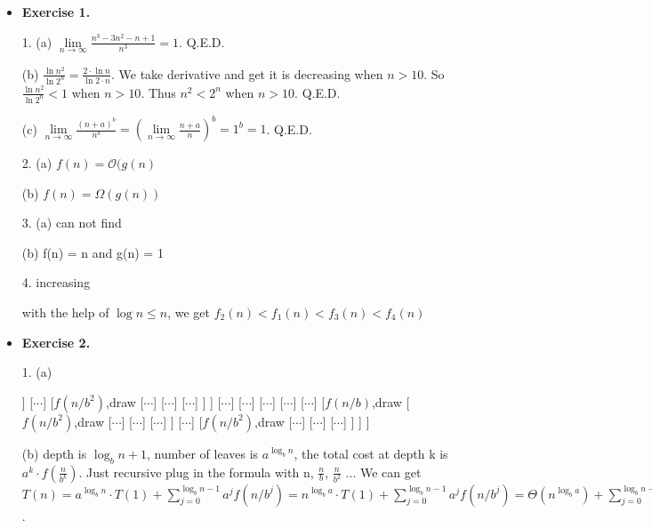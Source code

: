 \documentclass{article}
\begin{document}
\noindent

\noindent{}

\begin{itemize}

\item \textbf{Exercise 1.}

1. (a) $\lim \limits_{n\to \infty}\frac{n^{3}-3 n^{2}-n+1}{n^3} = 1$. Q.E.D.

(b) $\frac{\ln{n^2}}{\ln{2^n}} = \frac{2\cdot \ln{n}}{\ln{2}\cdot n}$. We take derivative and get it is decreasing when $n > 10$. So $\frac{\ln{n^2}}{\ln{2^n}} < 1$ when $n > 10$. Thus $n^2 < 2^n$ when $n > 10$. Q.E.D.

(c) $\lim \limits_{n\to \infty} \frac{(n+a)^b}{n^b} = (\lim \limits_{n\to \infty}\frac{n+a}{n})^b = 1^b = 1$. Q.E.D.

2. (a) $f(n)=\mathcal{O}(g(n)$

(b) $f(n) = \Omega(g(n))$

3. (a) can not find

(b) f(n) = n and g(n) = 1

4. increasing

with the help of $\log{n} \le n$, we get $f_{2}(n)<f_{1}(n)<f_{3}(n)<f_{4}(n)$

\item \textbf{Exercise 2.}

1. (a)

\begin{center}
\begin{forest}
[$f(n)$,draw
	[$f(n/b)$,draw
		[$f(n/b^2)$,draw
			[$\cdots$]
			[$\cdots$]
			[$\cdots$]
		]
		[$\cdots$]
		[$f(n/b^2)$,draw
			[$\cdots$]
			[$\cdots$]
			[$\cdots$]
		]
	]
	[$\cdots$]
	[$\cdots$]
	[$\cdots$]
	[$\cdots$]
	[$\cdots$]
	[$f(n/b)$,draw
		[$f(n/b^2)$,draw
			[$\cdots$]
			[$\cdots$]
			[$\cdots$]
		]
		[$\cdots$]
		[$f(n/b^2)$,draw
			[$\cdots$]
			[$\cdots$]
			[$\cdots$]
		]
	]
]
\end{forest}
\end{center}

(b) depth is $\log_b n + 1$, number of leaves is $a^{\log_b n}$, the total cost at depth k is $a^k\cdot f(\frac{n}{b^k})$. Just recursive plug in the formula with n, $\frac{n}{b}$, $\frac{n}{b^2}$ ... We can get $T(n) = a^{\log_{b} n} \cdot T(1) + \sum_{j=0}^{\log _{b} n-1} a^{j} f\left(n / b^{j}\right) = n^{\log_{b} a} \cdot T(1) + \sum_{j=0}^{\log _{b} n-1} a^{j} f\left(n / b^{j}\right) = \Theta\left(n^{\log _{b} a}\right)+\sum_{j=0}^{\log _{b} n-1} a^{j} f\left(n / b^{j}\right)$.


\end{itemize}
\end{document}
